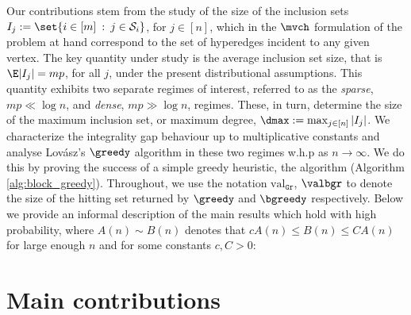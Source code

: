 \noindent
Our contributions stem from the study of the size of the inclusion sets $I_j := \set{i \in [m]\: : \: j \in \mathcal{S}_i}$, for $j \in [n]$, which in the \(\mvch\) formulation of the problem at hand correspond to the set of hyperedges incident to any given vertex. 
The key quantity under study is the average inclusion set size, that is $\E |I_j| = mp$, for all $j$, under the present distributional assumptions. 
This quantity exhibits two separate regimes of interest, referred to as the \emph{sparse}, $mp \ll \log{n}$, and \emph{dense}, $mp \gg \log{n}$, regimes. 
These, in turn, determine the size of the maximum inclusion set, or maximum degree, $\dmax := \max_{j \in [n]} |I_j|$. 
We characterize the integrality gap behaviour up to multiplicative constants and analyse Lovász's $\greedy$ algorithm \cite{lovasz1975ratio} in these two regimes w.h.p as $n \to \infty$. 
We do this by proving the success of a simple greedy heuristic, the \bgreedy algorithm (Algorithm \ref{alg:block_greedy}). 
Throughout, we use the notation $\text{val}_{\mathtt{Gr}}$, $\valbgr$ to denote the size of the hitting set returned by $\greedy$ and $\bgreedy$ respectively. Below we provide an informal description of the main results which hold with high probability, where $A(n) \sim B(n)$ denotes that $c A(n) \leq B(n) \leq C A(n)$ for large enough $n$ and for some constants $c, C > 0$: 
\\

\section{Main contributions}\label{sec:intro}



